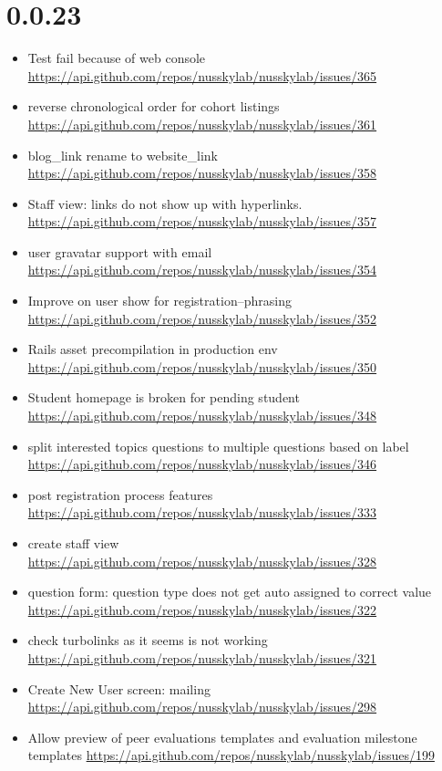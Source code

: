 {\section{0.0.23}
\begin{itemize}[noitemsep]
    \item Test fail because of web console \url{https://api.github.com/repos/nusskylab/nusskylab/issues/365} 
    \item reverse chronological order for cohort listings \url{https://api.github.com/repos/nusskylab/nusskylab/issues/361} 
    \item blog\_link rename to website\_link \url{https://api.github.com/repos/nusskylab/nusskylab/issues/358} 
    \item Staff view: links do not show up with hyperlinks. \url{https://api.github.com/repos/nusskylab/nusskylab/issues/357} 
    \item user gravatar support with email \url{https://api.github.com/repos/nusskylab/nusskylab/issues/354} 
    \item Improve on user show for registration--phrasing \url{https://api.github.com/repos/nusskylab/nusskylab/issues/352} 
    \item Rails asset precompilation in production env \url{https://api.github.com/repos/nusskylab/nusskylab/issues/350} 
    \item Student homepage is broken for pending student \url{https://api.github.com/repos/nusskylab/nusskylab/issues/348} 
    \item split interested topics questions to multiple questions based on label \url{https://api.github.com/repos/nusskylab/nusskylab/issues/346} 
    \item post registration process features \url{https://api.github.com/repos/nusskylab/nusskylab/issues/333} 
    \item create staff view \url{https://api.github.com/repos/nusskylab/nusskylab/issues/328} 
    \item question form: question type does not get auto assigned to correct value \url{https://api.github.com/repos/nusskylab/nusskylab/issues/322} 
    \item check turbolinks as it seems is not working \url{https://api.github.com/repos/nusskylab/nusskylab/issues/321} 
    \item Create New User screen: mailing \url{https://api.github.com/repos/nusskylab/nusskylab/issues/298} 
    \item Allow preview of peer evaluations templates and evaluation milestone templates \url{https://api.github.com/repos/nusskylab/nusskylab/issues/199} 
\end{itemize}

}
